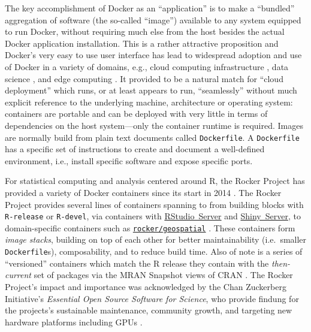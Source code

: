 The key accomplishment of Docker as an ``application'' is to make a
``bundled'' aggregation of software (the so-called ``image'') available
to any system equipped to run Docker, without requiring much else from
the host besides the actual Docker application installation. This is a
rather attractive proposition and Docker's very easy to use user
interface has lead to widespread adoption and use of Docker in a variety
of domains, e.g., cloud computing infrastructure
\citep[e.g.,][]{Bernstein2014}, data science
\citep[e.g.,][]{boettiger_introduction_2015}, and edge computing
\citep[e.g.,][]{alam_orchestration_2018}. It provided to be a natural
match for ``cloud deployment'' which runs, or at least appears to run,
``seamlessly'' without much explicit reference to the underlying
machine, architecture or operating system: containers are portable and
can be deployed with very little in terms of dependencies on the host
system---only the container runtime is required. Images are normally
build from plain text documents called \texttt{Dockerfile}. A
\texttt{Dockerfile} has a specific set of instructions to create and
document a well-defined environment, i.e., install specific software and
expose specific ports.

For statistical computing and analysis centered around R, the Rocker
Project has provided a variety of Docker containers since its start in
2014 \citep{RJ-2017-065}. The Rocker Project provides several lines of
containers spanning to from building blocks with \texttt{R-release} or
\texttt{R-devel}, via containers with
\href{https://rstudio.com/products/rstudio/}{RStudio~Server} and
\href{https://rstudio.com/products/shiny/shiny-server/}{Shiny~Server},
to domain-specific containers such as
\href{https://github.com/rocker-org/geospatial}{\texttt{rocker/geospatial}}
\citep{rocker_geospatial_2019}. These containers form \emph{image
stacks}, building on top of each other for better maintainability
(i.e.~smaller \texttt{Dockerfile}s), composability, and to reduce build
time. Also of note is a series of ``versioned'' containers which match
the R release they contain with the \emph{then-current} set of packages
via the MRAN Snapshot views of CRAN \citep{microsoft_cran_2019}. The
Rocker Project's impact and importance was acknowledged by the Chan
Zuckerberg Initiative's \emph{Essential Open Source Software for
Science}, who provide findung for the projects's sustainable
maintenance, community growth, and targeting new hardware platforms
including GPUs \citep{chan_zuckerberg_initiative_maintaining_2019}.

